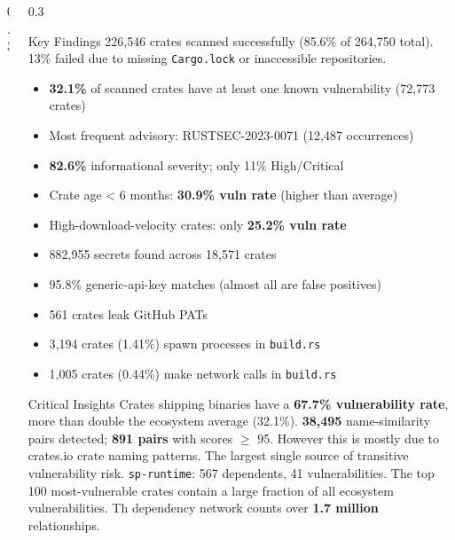 \documentclass[final]{beamer}
\begin{document}
\begin{frame}[fragile]
\begin{columns}[t]
\begin{column}{0.3\paperwidth}
\end{column}

\separatorcolumn

\begin{column}{0.3\paperwidth}

\begin{alertblock}{Key Findings}
    226,546 crates scanned successfully (85.6\% of 264,750 total).\\
    13\% failed due to missing \texttt{Cargo.lock} or inaccessible repositories.

    \bigskip
    \begin{itemize}
        \item \textbf{32.1\%} of scanned crates have at least one known vulnerability (72,773 crates)
        \item Most frequent advisory: RUSTSEC-2023-0071 (12,487 occurrences)
        \item \textbf{82.6\%} informational severity; only 11\% High/Critical
        \item Crate age < 6 months: \textbf{30.9\% vuln rate} (higher than average)
        \item High-download-velocity crates: only \textbf{25.2\% vuln rate}
    \end{itemize}

    \bigskip
    \begin{itemize}
        \item 882,955 secrets found across 18,571 crates
        \item 95.8\% generic-api-key matches (almost all are false positives)
        \item 561 crates leak GitHub PATs
        \item 3,194 crates (1.41\%) spawn processes in \texttt{build.rs}
        \item 1,005 crates (0.44\%) make network calls in \texttt{build.rs}
    \end{itemize}
\end{alertblock}

\begin{alertblock}{Critical Insights}
    Crates shipping binaries have a \textbf{67.7\% vulnerability rate}, more than double the ecosystem average (32.1\%).
    \textbf{38,495} name-similarity pairs detected; \textbf{891 pairs} with
    scores $\geq$ 95. However this is mostly due to crates.io crate naming patterns.
    The largest single source of transitive vulnerability risk. \texttt{sp-runtime}: 567 dependents, 41 vulnerabilities.
    The top 100 most-vulnerable crates contain a large fraction of all ecosystem vulnerabilities. Th dependency network counts over \textbf{1.7 million} relationships.
\end{alertblock}


\end{column}
\end{columns}
\end{frame}
\end{document}
